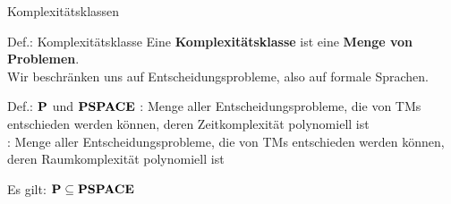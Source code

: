 \begin{frame}{Komplexitätsklassen}
    \begin{block}{Def.: Komplexitätsklasse}
        Eine \textbf{Komplexitätsklasse} ist eine \textbf{Menge von Problemen}.\\
        Wir beschränken uns auf Entscheidungsprobleme, also auf formale Sprachen.
    \end{block}

    \begin{block}{Def.: $\text{\bfseries P}$ und $\text{\bfseries PSPACE}$}
        \Pclass: Menge aller Entscheidungsprobleme, die von TMs entschieden werden können, deren Zeitkomplexität polynomiell ist\\[1ex]
        \PSPACE: Menge aller Entscheidungsprobleme, die von TMs entschieden werden können, deren Raumkomplexität polynomiell ist 
    \end{block}

    Es gilt: $\text{\bfseries P} \subseteq \text{\bfseries PSPACE}$
\end{frame}